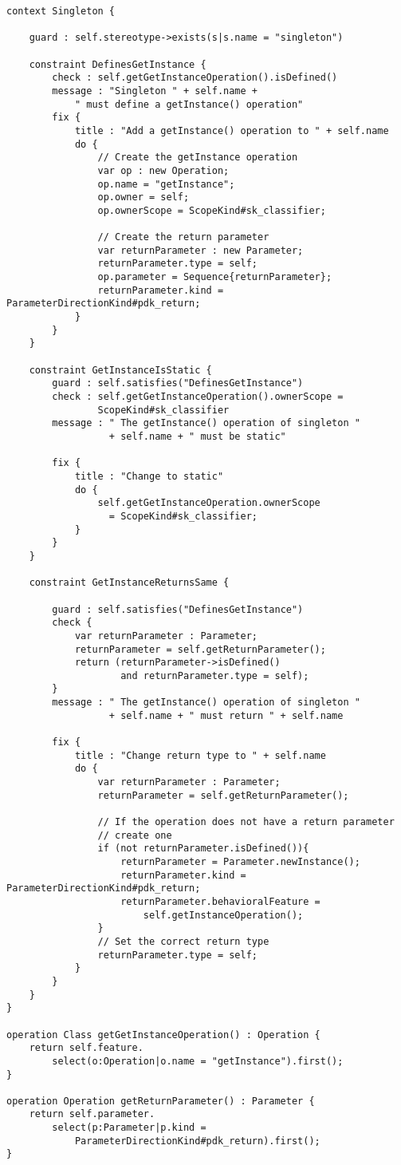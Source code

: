 \begin{lstlisting}[float=tbp, caption=EVL Module for Validating Singletons, label=lst:CaseStudy, language=EVL]
context Singleton {
	
	guard : self.stereotype->exists(s|s.name = "singleton")
	
	constraint DefinesGetInstance {
		check : self.getGetInstanceOperation().isDefined()
		message : "Singleton " + self.name + 
			" must define a getInstance() operation"
		fix {
			title : "Add a getInstance() operation to " + self.name
			do {
				// Create the getInstance operation
				var op : new Operation;
				op.name = "getInstance";
				op.owner = self;
				op.ownerScope = ScopeKind#sk_classifier;
				
				// Create the return parameter
				var returnParameter : new Parameter;
				returnParameter.type = self;
				op.parameter = Sequence{returnParameter};
				returnParameter.kind = ParameterDirectionKind#pdk_return;
			}
		}
	}
	
	constraint GetInstanceIsStatic {
		guard : self.satisfies("DefinesGetInstance")
		check : self.getGetInstanceOperation().ownerScope = 
		        ScopeKind#sk_classifier
		message : " The getInstance() operation of singleton " 
		          + self.name + " must be static"
	
		fix {
			title : "Change to static"
			do {
				self.getGetInstanceOperation.ownerScope 
				  = ScopeKind#sk_classifier;
			}
		}
	}
	
	constraint GetInstanceReturnsSame {
	
		guard : self.satisfies("DefinesGetInstance")
		check {
			var returnParameter : Parameter;
			returnParameter = self.getReturnParameter();
			return (returnParameter->isDefined() 
			        and returnParameter.type = self);
		}
		message : " The getInstance() operation of singleton " 
		          + self.name + " must return " + self.name
			
		fix {
			title : "Change return type to " + self.name
			do {
				var returnParameter : Parameter;
				returnParameter = self.getReturnParameter();
				
				// If the operation does not have a return parameter
				// create one
				if (not returnParameter.isDefined()){
					returnParameter = Parameter.newInstance();
					returnParameter.kind = ParameterDirectionKind#pdk_return;
					returnParameter.behavioralFeature = 
						self.getInstanceOperation();
				}
				// Set the correct return type
				returnParameter.type = self;
			}
		}
	}
}

operation Class getGetInstanceOperation() : Operation {
	return self.feature.
		select(o:Operation|o.name = "getInstance").first();
}

operation Operation getReturnParameter() : Parameter {
	return self.parameter.
		select(p:Parameter|p.kind = 
			ParameterDirectionKind#pdk_return).first();
}
\end{lstlisting}